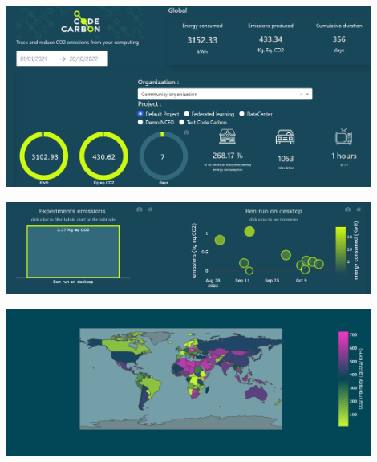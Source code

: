 \documentclass[12pt,a4paper]{report}
\begin{document}
\begin{center}
  \includegraphics[width=0.9\textwidth]{imagenes/CC_3.png}
  \label{}
\end{center}

\begin{center}
  \includegraphics[width=0.9\textwidth]{imagenes/CC_4.png}
  \label{}
\end{center}

\begin{center}
  \includegraphics[width=0.9\textwidth]{imagenes/CC_5.png}
  \label{}
\end{center}
\end{document}

